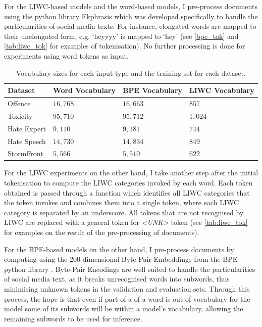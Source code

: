 For the LIWC-based models and the word-based models, I pre-process documents using the python library Ekphrasis \citep{baziotis:2017} which was developed specifically to handle the particularities of social media texts. For instance, elongated words are mapped to their unelongated form, e.g. `heyyyy' is mapped to `hey' (see \cref{bpe_tok} and \cref{tab:liwc_tok} for examples of tokenisation). No further processing is done for experiments using word tokens as input.

\begin{table}[]
  \centering
  \begin{tabular}{llll}
    Dataset     & Word Vocabulary & BPE Vocabulary & LIWC Vocabulary \\\hline
    Offence     & $16,768$        & $16,663$       & $857$           \\
    Toxicity    & $95,710$        & $95,712$       & $1,024$         \\
    Hate Expert & $9,110$         & $9,181$        & $744$           \\
    Hate Speech & $14,730$        & $14,834$       & $849$           \\
    StormFront  & $5,566$         & $5,510$        & $622$
  \end{tabular}
  \caption{Vocabulary sizes for each input type and the training set for each dataset.}
  \label{tab:vocab_sizes}
\end{table}

For the LIWC experiments on the other hand, I take another step after the initial tokenisation to compute the LIWC categories invoked by each word. Each token obtained is passed through a function which identifies all LIWC categories that the token invokes and combines them into a single token, where each LIWC category is separated by an underscore. All tokens that are not recognised by LIWC are replaced with a general token for \textit{<UNK>} token (see \cref{tab:liwc_tok} for examples on the result of the pre-processing of documents).

For the BPE-based models on the other hand, I pre-process documents by computing using the 200-dimensional Byte-Pair Embeddings from the BPE python library \citep{Heinzerling:2018}. Byte-Pair Encodings are well suited to handle the particularities of social media text, as it breaks unrecognised words into subwords, thus minimising unknown tokens in the validation and evaluation sets. Through this process, the hope is that even if part of a of a word is out-of-vocabulary for the model some of its subwords will be within a model's vocabulary, allowing the remaining subwords to be used for inference.

